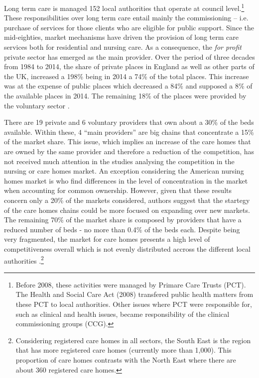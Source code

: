 \documentclass[12pt,letterpaper]{article}
\begin{document}
 Long term care is managed 152 local authorities that operate at council level.\footnote{Before 2008, these activities
 were managed by  Primare Care Trusts (PCT). The Health and Social Care Act (2008) 
transfered public health matters from these PCT to local authorities. Other issues where PCT were responsible for, such as clinical and health issues, 
became responsibility of the clinical commissioning groups (CCG).} 
These responsibilities over long term care entail mainly the commissioning – i.e. purchase of services 
for those clients who are eligible for public support.  Since the mid-eighties, market mechanisms have driven the provision of long term care services 
both for residential and nursing care. As a consequence, the \textit{for profit} private sector has emerged as the  
main provider. Over the period of three decades from 1984 to 2014, the share of 
private places in England as well as other parts of the UK,  increased a 198\%  being in 2014 a 74\% of the total places. 
This increase was at the expense of public places which decreased a 84\% and supposed a 8\% of the available places 
in 2014. The remaining 18\% of the places were provided by the voluntary sector \citet{jarret2017}. 

There are 19 private and 6 voluntary providers that own about a 30\% of the beds available. Within these, 
4 “main providers” are big chains that concentrate a 15\% of the market share. 
This issue, which implies an increase of the care homes that are owned by the same provider and therefore
a reduction of the competition, has not received much attention in the studies analysing the competition in
the nursing or care homes market. An exception considering the American nursing homes market  
is \citet{hirth2017effects} who find differences in the level of concentration 
in the market when accounting for common ownership.  However, given that these results concern 
only a 20\% of the markets considered, authors suggest that the startegy of the care homes chains could 
be more focused on expanding over new markets.  The remaining 70\% of the market share is composed by providers 
  that have a reduced number of beds - no more than 0.4\% of the beds each.  Despite 
  being very fragmented, the market for care homes presents a high level of competitiveness 
  overall which is not evenly distributed accross the different local authorities \citep{forder2011, forder2014}.\footnote{Considering registered
    care homes in all sectors, the South East is the region that has more
     registered care homes (currently more than 1,000). This proportion
      of care homes contrasts with the North East where there are about 360 registered care homes.}
 
\end{document}

